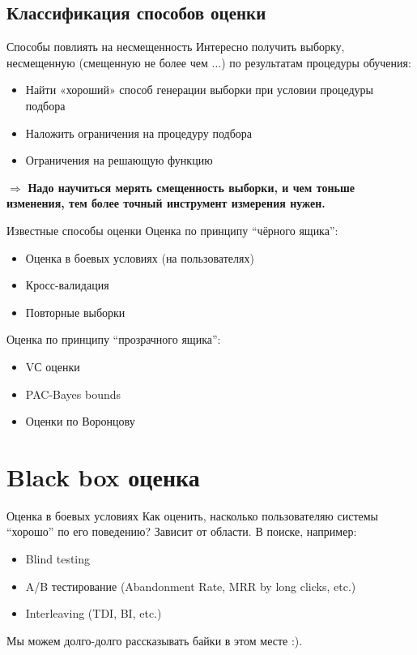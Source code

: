 \documentclass[14pt, fleqn, xcolor={dvipsnames, table}]{beamer}
\begin{document}
\subsection{Классификация способов оценки}
\begin{frame}{Способы повлиять на несмещенность}
Интересно получить выборку, несмещенную (смещенную не более чем $\ldots$) по результатам процедуры обучения:
\begin{itemize}
 \item Найти «хороший» способ генерации выборки при условии процедуры подбора
 \item Наложить ограничения на процедуру подбора
 \item Ограничения на решающую функцию
\end{itemize}
$\Rightarrow$ \textbf{Надо научиться мерять смещенность выборки, и чем тоньше изменения, тем более точный инструмент измерения нужен.}
\end{frame}

\begin{frame}{Известные способы оценки}
Оценка по принципу ``чёрного ящика'':
\begin{itemize}
  \item Оценка в боевых условиях (на пользователях)
  \item Кросс-валидация
  \item Повторные выборки
\end{itemize}
Оценка по принципу ``прозрачного ящика'':
\begin{itemize}
  \item VС оценки
  \item PAC-Bayes bounds
  \item Оценки по Воронцову
\end{itemize}
\end{frame}

\section{Black box оценка}
\begin{frame}{Оценка в боевых условиях}
Как оценить, насколько пользователяю системы ``хорошо'' по его поведению?
Зависит от области. В поиске, например:
\begin{itemize}
\item Blind testing
\item A/B тестирование (Abandonment Rate, MRR by long clicks, etc.)
\item Interleaving (TDI, BI, etc.)
\end{itemize}
\footnotesize Мы можем долго-долго рассказывать байки в этом месте :).
\end{frame}
\end{document}
